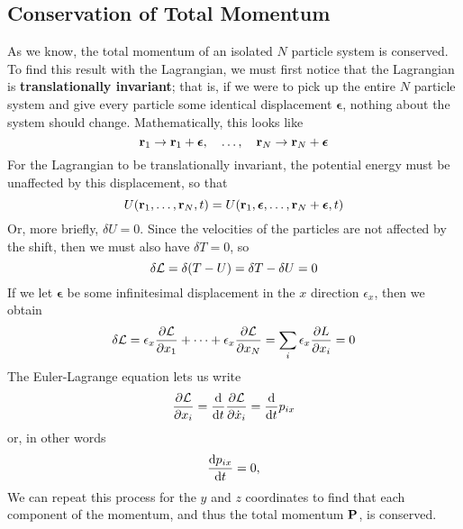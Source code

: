 \subsection*{Conservation of Total Momentum}
As we know, the total momentum of an isolated $N$ particle system is conserved. To find this result with the Lagrangian, we must first notice that the Lagrangian is \textbf{translationally invariant}; that is, if we were to pick up the entire $N$ particle system and give every particle some identical displacement $\boldsymbol{\epsilon}$, nothing about the system should change. Mathematically, this looks like
\[ \mathbf{r}_1 \to \mathbf{r}_1 + \boldsymbol{\epsilon}, \quad \dots, \quad \mathbf{r}_N \to \mathbf{r}_N + \boldsymbol{\epsilon}\]
For the Lagrangian to be translationally invariant, the potential energy must be unaffected by this displacement, so that
\[ U(\mathbf{r}_1, \dots, \mathbf{r}_N, t) = U(\mathbf{r}_1, \boldsymbol{\epsilon} , \dots , \mathbf{r}_N + \boldsymbol{\epsilon}, t)\]
Or, more briefly, $\delta U = 0$. Since the velocities of the particles are not affected by the shift, then we must also have $\delta T = 0$, so
\[ \delta \mathcal{L} = \delta (T-U) = \delta T - \delta U = 0\]
If we let $\boldsymbol{\epsilon}$ be some infinitesimal displacement in the $x$ direction $\epsilon_x$, then we obtain
\[ \delta \mathcal{L} = \epsilon_x \pdv{\mathcal{L}}{x_1} + \cdots + \epsilon_x \pdv{\mathcal{L}}{x_N} = \sum_i \epsilon_x \pdv{L}{x_i} = 0 \]
The Euler-Lagrange equation lets us write
\[ \pdv{\mathcal{L}}{x_i} = \dv{t} \pdv{\mathcal{L}}{\dot x_i} = \dv{t} p_{ix}\]
or, in other words
\[ \dv{p_{ix}}{t} = 0,\]
We can repeat this process for the $y$ and $z$ coordinates to find that each component of the momentum, and thus the total momentum $\mathbf{P}$, is conserved.
